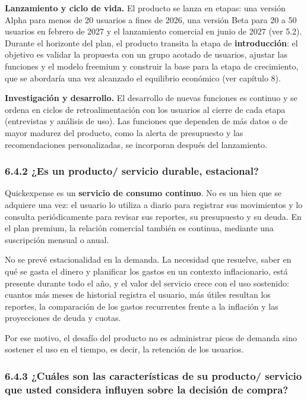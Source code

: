 \textbf{Lanzamiento y ciclo de vida.} El producto se lanza en etapas:
una versión Alpha para menos de 20 usuarios a fines de 2026, una versión
Beta para 20 a 50 usuarios en febrero de 2027 y el lanzamiento comercial
en junio de 2027 (ver 5.2). Durante el horizonte del plan, el producto
transita la etapa de \textbf{introducción}: el objetivo es validar la
propuesta con un grupo acotado de usuarios, ajustar las funciones y el
modelo freemium y construir la base para la etapa de crecimiento, que se
abordaría una vez alcanzado el equilibrio económico (ver capítulo 8).

\textbf{Investigación y desarrollo.} El desarrollo de nuevas funciones
es continuo y se ordena en ciclos de retroalimentación con los usuarios
al cierre de cada etapa (entrevistas y análisis de uso). Las funciones
que dependen de más datos o de mayor madurez del producto, como la
alerta de presupuesto y las recomendaciones personalizadas, se
incorporan después del lanzamiento.

\subsubsection*{6.4.2 ¿Es un producto/ servicio durable,
estacional?}\label{es-un-producto-servicio-durable-estacional}

Quickexpense es un \textbf{servicio de consumo continuo}. No es un bien
que se adquiere una vez: el usuario lo utiliza a diario para registrar
sus movimientos y lo consulta periódicamente para revisar sus reportes,
su presupuesto y su deuda. En el plan premium, la relación comercial
también es continua, mediante una suscripción mensual o anual.

No se prevé estacionalidad en la demanda. La necesidad que resuelve,
saber en qué se gasta el dinero y planificar los gastos en un contexto
inflacionario, está presente durante todo el año, y el valor del
servicio crece con el uso sostenido: cuantos más meses de historial
registra el usuario, más útiles resultan los reportes, la comparación de
los gastos recurrentes frente a la inflación y las proyecciones de deuda
y cuotas.

Por ese motivo, el desafío del producto no es administrar picos de
demanda sino sostener el uso en el tiempo, es decir, la retención de los
usuarios.

\subsubsection*{6.4.3 ¿Cuáles son las características de su producto/
servicio que usted considera influyen sobre la decisión de
compra?}\label{cuuxe1les-son-las-caracteruxedsticas-de-su-producto-servicio-que-usted-considera-influyen-sobre-la-decisiuxf3n-de-compra}

